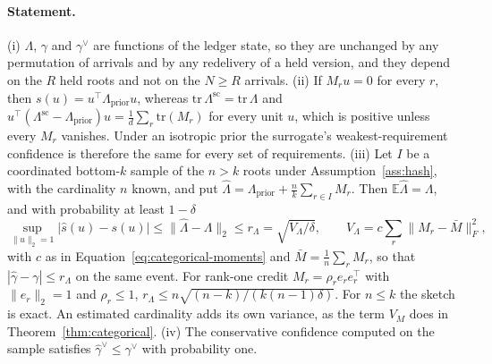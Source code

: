 \documentclass{article}
\begin{document}
\paragraph{Statement.} (i) $\Lambda$, $\gamma$ and $\gamma^\vee$ are functions
of the ledger state, so they are unchanged by any permutation of arrivals and
by any redelivery of a held version, and they depend on the $R$ held roots and
not on the $N\ge R$ arrivals. (ii) If $M_ru=0$ for every $r$, then
$s(u)=u^\top\Lambda_{\text{prior}}u$, whereas
$\mathrm{tr}\,\Lambda^{\mathrm{sc}}=\mathrm{tr}\,\Lambda$ and
$u^\top(\Lambda^{\mathrm{sc}}-\Lambda_{\text{prior}})u=\tfrac{1}{d}\sum_r
\mathrm{tr}(M_r)$ for every unit $u$, which is positive unless every $M_r$
vanishes. Under an isotropic prior the surrogate's weakest-requirement
confidence is therefore the same for every set of requirements. (iii) Let $I$ be
a coordinated bottom-$k$ sample of the $n>k$ roots under
Assumption~\ref{ass:hash}, with the cardinality $n$ known, and put
$\hat\Lambda=\Lambda_{\text{prior}}+\tfrac{n}{k}\sum_{r\in I}M_r$. Then
$\mathbb{E}\hat\Lambda=\Lambda$, and with probability at least $1-\delta$
\begin{equation}
\sup_{\|u\|_2=1}\bigl|\hat s(u)-s(u)\bigr|\le\|\hat\Lambda-\Lambda\|_2\le
r_\Lambda=\sqrt{V_\Lambda/\delta},\qquad
V_\Lambda=c\sum_r\|M_r-\bar M\|_F^2,
\label{eq:directional-radius}
\end{equation}
with $c$ as in Equation~\ref{eq:categorical-moments} and
$\bar M=\tfrac{1}{n}\sum_rM_r$, so that $|\hat\gamma-\gamma|\le r_\Lambda$ on the
same event. For rank-one credit $M_r=\rho_re_re_r^\top$ with $\|e_r\|_2=1$ and
$\rho_r\le1$, $r_\Lambda\le n\sqrt{(n-k)/(k(n-1)\delta)}$. For $n\le k$ the
sketch is exact. An estimated cardinality adds its own variance, as the term
$V_M$ does in Theorem~\ref{thm:categorical}. (iv) The conservative confidence
computed on the sample satisfies $\hat\gamma^\vee\le\gamma^\vee$ with
probability one.
\end{document}

